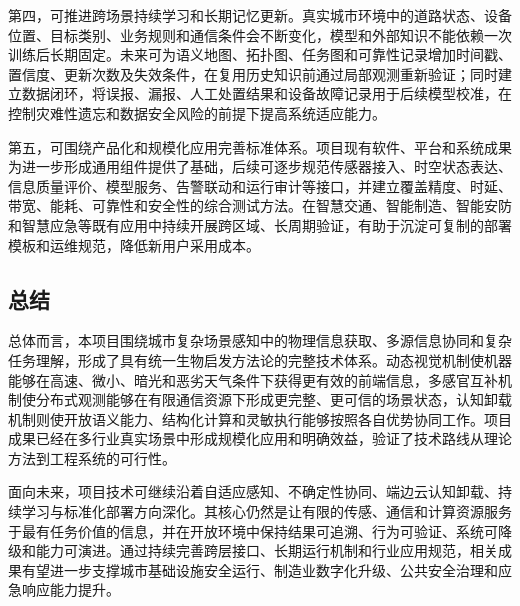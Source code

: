 第四，可推进跨场景持续学习和长期记忆更新。真实城市环境中的道路状态、设备位置、目标类别、业务规则和通信条件会不断变化，模型和外部知识不能依赖一次训练后长期固定。未来可为语义地图、拓扑图、任务图和可靠性记录增加时间戳、置信度、更新次数及失效条件，在复用历史知识前通过局部观测重新验证；同时建立数据闭环，将误报、漏报、人工处置结果和设备故障记录用于后续模型校准，在控制灾难性遗忘和数据安全风险的前提下提高系统适应能力。

第五，可围绕产品化和规模化应用完善标准体系。项目现有软件、平台和系统成果为进一步形成通用组件提供了基础，后续可逐步规范传感器接入、时空状态表达、信息质量评价、模型服务、告警联动和运行审计等接口，并建立覆盖精度、时延、带宽、能耗、可靠性和安全性的综合测试方法。在智慧交通、智能制造、智能安防和智慧应急等既有应用中持续开展跨区域、长周期验证，有助于沉淀可复制的部署模板和运维规范，降低新用户采用成本。

\subsection{总结}

总体而言，本项目围绕城市复杂场景感知中的物理信息获取、多源信息协同和复杂任务理解，形成了具有统一生物启发方法论的完整技术体系。动态视觉机制使机器能够在高速、微小、暗光和恶劣天气条件下获得更有效的前端信息，多感官互补机制使分布式观测能够在有限通信资源下形成更完整、更可信的场景状态，认知卸载机制则使开放语义能力、结构化计算和灵敏执行能够按照各自优势协同工作。项目成果已经在多行业真实场景中形成规模化应用和明确效益，验证了技术路线从理论方法到工程系统的可行性。

面向未来，项目技术可继续沿着自适应感知、不确定性协同、端边云认知卸载、持续学习与标准化部署方向深化。其核心仍然是让有限的传感、通信和计算资源服务于最有任务价值的信息，并在开放环境中保持结果可追溯、行为可验证、系统可降级和能力可演进。通过持续完善跨层接口、长期运行机制和行业应用规范，相关成果有望进一步支撑城市基础设施安全运行、制造业数字化升级、公共安全治理和应急响应能力提升。
\clearpage
